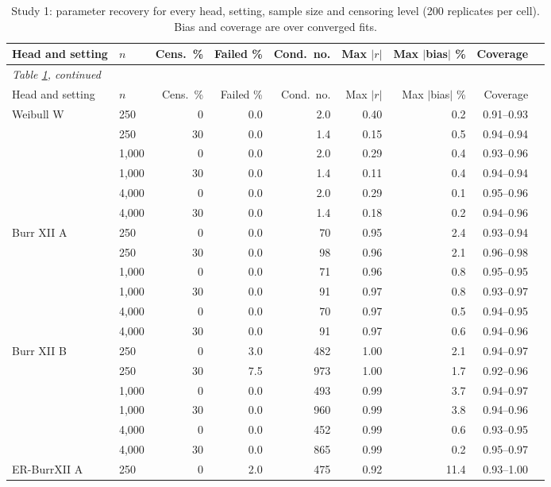 {\small
\begin{longtable}{llrrrrrrr}
\caption{Study 1: parameter recovery for every head, setting, sample size and censoring level (200 replicates per cell). Bias and coverage are over converged fits.}\label{stab:recovery}\\
\toprule
Head and setting & $n$ & Cens.\ \% & Failed \% & Cond.\ no. & Max $|r|$ & Max $|$bias$|$ \% & Coverage \\
\midrule
\endfirsthead
\multicolumn{9}{l}{\emph{Table \ref{stab:recovery}, continued}}\\
\toprule
Head and setting & $n$ & Cens.\ \% & Failed \% & Cond.\ no. & Max $|r|$ & Max $|$bias$|$ \% & Coverage \\
\midrule
\endhead
\bottomrule
\endfoot
Weibull W & 250 & 0 & 0.0 & 2.0 & 0.40 & 0.2 & 0.91--0.93 \\
 & 250 & 30 & 0.0 & 1.4 & 0.15 & 0.5 & 0.94--0.94 \\
 & 1,000 & 0 & 0.0 & 2.0 & 0.29 & 0.4 & 0.93--0.96 \\
 & 1,000 & 30 & 0.0 & 1.4 & 0.11 & 0.4 & 0.94--0.94 \\
 & 4,000 & 0 & 0.0 & 2.0 & 0.29 & 0.1 & 0.95--0.96 \\
 & 4,000 & 30 & 0.0 & 1.4 & 0.18 & 0.2 & 0.94--0.96 \\
Burr XII A & 250 & 0 & 0.0 & 70 & 0.95 & 2.4 & 0.93--0.94 \\
 & 250 & 30 & 0.0 & 98 & 0.96 & 2.1 & 0.96--0.98 \\
 & 1,000 & 0 & 0.0 & 71 & 0.96 & 0.8 & 0.95--0.95 \\
 & 1,000 & 30 & 0.0 & 91 & 0.97 & 0.8 & 0.93--0.97 \\
 & 4,000 & 0 & 0.0 & 70 & 0.97 & 0.5 & 0.94--0.95 \\
 & 4,000 & 30 & 0.0 & 91 & 0.97 & 0.6 & 0.94--0.96 \\
Burr XII B & 250 & 0 & 3.0 & 482 & 1.00 & 2.1 & 0.94--0.97 \\
 & 250 & 30 & 7.5 & 973 & 1.00 & 1.7 & 0.92--0.96 \\
 & 1,000 & 0 & 0.0 & 493 & 0.99 & 3.7 & 0.94--0.97 \\
 & 1,000 & 30 & 0.0 & 960 & 0.99 & 3.8 & 0.94--0.96 \\
 & 4,000 & 0 & 0.0 & 452 & 0.99 & 0.6 & 0.93--0.95 \\
 & 4,000 & 30 & 0.0 & 865 & 0.99 & 0.2 & 0.95--0.97 \\
ER-BurrXII A & 250 & 0 & 2.0 & 475 & 0.92 & 11.4 & 0.93--1.00 \\

\end{longtable}}
